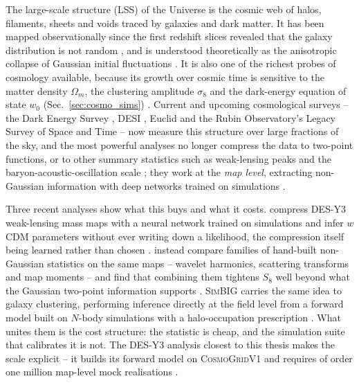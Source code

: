 \documentclass{report}
\begin{document}
The large-scale structure (LSS) of the Universe is the cosmic web of halos, filaments, sheets and voids traced by galaxies and dark matter. It has been mapped observationally since the first redshift slices revealed that the galaxy distribution is not random \cite{de_lapparent_slice_1986}, and is understood theoretically as the anisotropic collapse of Gaussian initial fluctuations \cite{bond_how_1996, libeskind_tracing_2018}. It is also one of the richest probes of cosmology available, because its growth over cosmic time is sensitive to the matter density \mbox{$\Omega_m$}, the clustering amplitude \mbox{$\sigma_8$} and the dark-energy equation of state \mbox{$w_0$} (Sec.~\ref{sec:cosmo_sims}) \cite{dodelson_modern_2020, huterer_growth_2023}. Current and upcoming cosmological surveys -- the Dark Energy Survey \cite{gatti_dark_2024}, DESI \cite{collaboration_desi_2016}, Euclid \cite{collaboration_euclid_2025} and the Rubin Observatory's Legacy Survey of Space and Time \cite{ivezic_lsst_2019} -- now measure this structure over large fractions of the sky, and the most powerful analyses no longer compress the data to two-point functions, or to other summary statistics such as weak-lensing peaks and the baryon-acoustic-oscillation scale \cite{eisenstein_baryonic_1998}; they work at the \emph{map level}, extracting non-Gaussian information with deep networks trained on simulations \cite{fluri_full_2022, jeffrey_dark_2024, gatti_dark_2024, thomsen_dark_2026}.

Three recent analyses show what this buys and what it costs. \citeauthor{jeffrey_dark_2024} compress DES-Y3 weak-lensing mass maps with a neural network trained on simulations and infer \mbox{$w$}CDM parameters without ever writing down a likelihood, the compression itself being learned rather than chosen \cite{jeffrey_dark_2024}. \citeauthor{gatti_dark_2024} instead compare families of hand-built non-Gaussian statistics on the same maps -- wavelet harmonics, scattering transforms and map moments -- and find that combining them tightens \mbox{$S_8$} well beyond what the Gaussian two-point information supports \cite{gatti_dark_2024}. \textsc{SimBIG} carries the same idea to galaxy clustering, performing inference directly at the field level from a forward model built on \mbox{$N$}-body simulations with a halo-occupation prescription \cite{lemos_simbig_2023}. What unites them is the cost structure: the statistic is cheap, and the simulation suite that calibrates it is not. The DES-Y3 analysis closest to this thesis makes the scale explicit -- it builds its forward model on \textsc{CosmoGridV1} and requires of order one million map-level mock realisations \cite{thomsen_dark_2026}.
\end{document}

